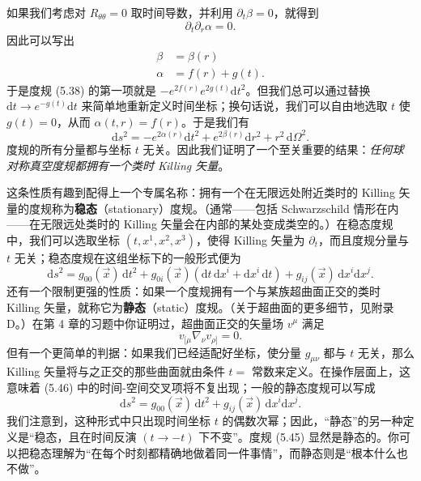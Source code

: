 如果我们考虑对 $R_{\theta\theta} = 0$ 取时间导数，并利用 $\partial_t\beta = 0$，就得到
\begin{equation*}
\partial_t\partial_r\alpha = 0.
\tag{5.43}
\end{equation*}
因此可以写出
\begin{align*}
\beta &= \beta(r)\\
\alpha &= f(r) + g(t).
\tag{5.44}
\end{align*}
于是度规 (5.38) 的第一项就是 $-e^{2f(r)}e^{2g(t)}\mathrm{d}t^2$。但我们总可以通过替换 $\mathrm{d}t \to e^{-g(t)}\mathrm{d}t$ 来简单地重新定义时间坐标；换句话说，我们可以自由地选取 $t$ 使 $g(t) = 0$，从而 $\alpha(t, r) = f(r)$。于是我们有
\begin{equation*}
\mathrm{d}s^2 = -e^{2\alpha(r)}\mathrm{d}t^2 + e^{2\beta(r)}\mathrm{d}r^2 + r^2\,\mathrm{d}\Omega^2.
\tag{5.45}
\end{equation*}
度规的所有分量都与坐标 $t$ 无关。因此我们证明了一个至关重要的结果：\emph{任何球对称真空度规都拥有一个类时 Killing 矢量}。

这条性质有趣到配得上一个专属名称：拥有一个在无限远处附近类时的 Killing 矢量的度规称为\textbf{稳态}（stationary）度规。（通常——包括 Schwarzschild 情形在内——在无限远处类时的 Killing 矢量会在内部的某处变成类空的。）在稳态度规中，我们可以选取坐标 $(t, x^1, x^2, x^3)$，使得 Killing 矢量为 $\partial_t$，而且度规分量与 $t$ 无关；稳态度规在这组坐标下的一般形式便为
\begin{equation*}
\mathrm{d}s^2 = g_{00}(\vec{x})\,\mathrm{d}t^2 + g_{0i}(\vec{x})(\mathrm{d}t\,\mathrm{d}x^i + \mathrm{d}x^i\,\mathrm{d}t) + g_{ij}(\vec{x})\,\mathrm{d}x^i\mathrm{d}x^j.
\tag{5.46}
\end{equation*}
还有一个限制更强的性质：如果一个度规拥有一个与某族超曲面正交的类时 Killing 矢量，就称它为\textbf{静态}（static）度规。（关于超曲面的更多细节，见附录 D。）在第 4 章的习题中你证明过，超曲面正交的矢量场 $v^\mu$ 满足
\begin{equation*}
v_{[\mu}\nabla_\nu v_{\rho]} = 0.
\tag{5.47}
\end{equation*}
但有一个更简单的判据：如果我们已经适配好坐标，使分量 $g_{\mu\nu}$ 都与 $t$ 无关，那么 Killing 矢量将与之正交的那些曲面就由条件 $t = $ 常数来定义。在操作层面上，这意味着 (5.46) 中的时间-空间交叉项将不复出现；一般的静态度规可以写成
\begin{equation*}
\mathrm{d}s^2 = g_{00}(\vec{x})\,\mathrm{d}t^2 + g_{ij}(\vec{x})\,\mathrm{d}x^i\mathrm{d}x^j.
\tag{5.48}
\end{equation*}
我们注意到，这种形式中只出现时间坐标 $t$ 的偶数次幂；因此，“静态”的另一种定义是“稳态，且在时间反演 $(t \to -t)$ 下不变”。度规 (5.45) 显然是静态的。你可以把稳态理解为“在每个时刻都精确地做着同一件事情”，而静态则是“根本什么也不做”。

